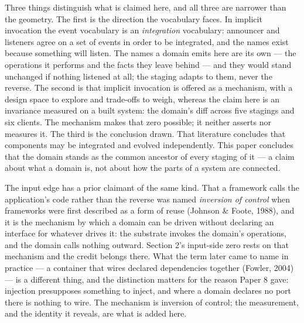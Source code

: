 \documentclass[
]{article}
\begin{document}
Three things distinguish what is claimed here, and all three are
narrower than the geometry. The first is the direction the vocabulary
faces. In implicit invocation the event vocabulary is an
\emph{integration} vocabulary: announcer and listeners agree on a set of
events in order to be integrated, and the names exist because something
will listen. The names a domain emits here are its own --- the
operations it performs and the facts they leave behind --- and they
would stand unchanged if nothing listened at all; the staging adapts to
them, never the reverse. The second is that implicit invocation is
offered as a mechanism, with a design space to explore and trade-offs to
weigh, whereas the claim here is an invariance measured on a built
system: the domain's diff across five stagings and six clients. The
mechanism makes that zero possible; it neither asserts nor measures it.
The third is the conclusion drawn. That literature concludes that
components may be integrated and evolved independently. This paper
concludes that the domain stands as the common ancestor of every staging
of it --- a claim about what a domain is, not about how the parts of a
system are connected.

The input edge has a prior claimant of the same kind. That a framework
calls the application's code rather than the reverse was named
\emph{inversion of control} when frameworks were first described as a
form of reuse (Johnson \& Foote, 1988), and it is the mechanism by which
a domain can be driven without declaring an interface for whatever
drives it: the substrate invokes the domain's operations, and the domain
calls nothing outward. Section 2's input-side zero rests on that
mechanism and the credit belongs there. What the term later came to name
in practice --- a container that wires declared dependencies together
(Fowler, 2004) --- is a different thing, and the distinction matters for
the reason Paper 8 gave: injection presupposes something to inject, and
where a domain declares no port there is nothing to wire. The mechanism
is inversion of control; the measurement, and the identity it reveals,
are what is added here.
\end{document}
